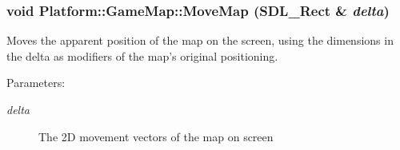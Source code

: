 \hypertarget{class_platform_1_1_game_map_76634e9c99fe04d801cc324ba0b0ed8a}{
\subsubsection[{MoveMap}]{\setlength{\rightskip}{0pt plus 5cm}void Platform::GameMap::MoveMap (SDL\_\-Rect \& {\em delta})}}
\label{de/db6/class_platform_1_1_game_map_76634e9c99fe04d801cc324ba0b0ed8a}


Moves the apparent position of the map on the screen, using the dimensions in the delta as modifiers of the map's original positioning.

\begin{Desc}
\item[Parameters:]
\begin{description}
\item[{\em delta}]The 2D movement vectors of the map on screen \end{description}
\end{Desc}
